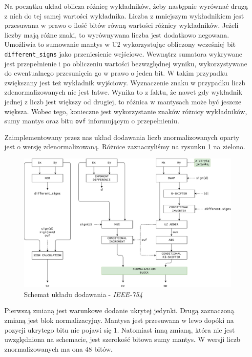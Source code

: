 \documentclass{article}
\begin{document}
Na początku układ oblicza różnicę wykładników, żeby następnie wyrównać drugą z nich do tej samej wartości wykładnika.
Liczba z mniejszym wykładnikiem jest przesuwana w prawo o ilość bitów równą wartości różnicy wykładników.
Jeżeli liczby mają różne znaki, to wyrównywana liczba jest dodatkowo negowana.
Umożliwia to sumowanie mantys w U2 wykorzystując obliczony wcześniej bit \texttt{different\_signs} jako przeniesienie wejściowe.
Wewnątrz sumatora wykrywane jest przepełnienie i po obliczeniu wartości bezwzględnej wyniku, wykorzystywane do ewentualnego przesunięcia go w prawo o jeden bit.
W takim przypadku zwiększany jest też wykładnik wyjściowy.
Wyznaczenie znaku w przypadku liczb zdenormalizowanych nie jest łatwe.
Wynika to z faktu, że nawet gdy wykładnik jednej z liczb jest większy od drugiej, to różnica w mantysach może być jeszcze większa.
Wobec tego, konieczne jest wykorzystanie znaków różnicy wykładników, sumy mantys oraz bitu \texttt{ovf} informującym o przepełnieniu.

Zaimplementowany przez nas układ dodawania liczb znormalizowanych oparty jest o wersję zdenormalizowaną.
Różnice zaznaczyliśmy na rysunku \ref{fig:diagram_add_ieee754} na zielono.

\begin{figure}[H]
	\centering
	\includegraphics[width=\textwidth]{figures/diagram_add_ieee754.pdf}
	\caption{Schemat układu dodawania - \emph{IEEE-754}}
	\label{fig:diagram_add_ieee754}
\end{figure}

Pierwszą zmianą jest warunkowe dodanie ukrytej jedynki.
Drugą zaznaczoną zmianą jest blok normalizacyjny.
Mantysa jest przesuwana w lewo dopóki na pozycji ukrytego bitu nie pojawi się 1.
Natomiast inną zmianą, która nie jest uwzględniona na schemacie, jest szerokość bitowa sumy mantys.
W wersji liczb znormalizowanych ma ona 48 bitów.
\end{document}
